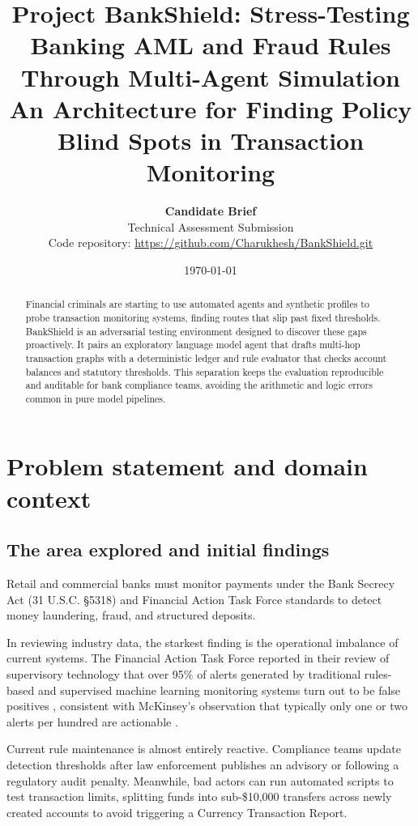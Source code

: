 \documentclass[10pt,twocolumn,a4paper]{article}
\title{\textbf{Project BankShield: Stress-Testing Banking AML and Fraud Rules Through Multi-Agent Simulation}\\[0.3em]
\large An Architecture for Finding Policy Blind Spots in Transaction Monitoring}
\author{\textbf{Candidate Brief} \\ Technical Assessment Submission \\ Code repository: \url{https://github.com/Charukhesh/BankShield.git}}
\date{\today}
\begin{document}
\maketitle

\begin{abstract}
Financial criminals are starting to use automated agents and synthetic profiles to probe transaction monitoring systems, finding routes that slip past fixed thresholds. BankShield is an adversarial testing environment designed to discover these gaps proactively. It pairs an exploratory language model agent that drafts multi-hop transaction graphs with a deterministic ledger and rule evaluator that checks account balances and statutory thresholds. This separation keeps the evaluation reproducible and auditable for bank compliance teams, avoiding the arithmetic and logic errors common in pure model pipelines.
\end{abstract}

\section{Problem statement and domain context}

\subsection{The area explored and initial findings}
Retail and commercial banks must monitor payments under the Bank Secrecy Act (31 U.S.C. \S 5318) and Financial Action Task Force standards to detect money laundering, fraud, and structured deposits. 

In reviewing industry data, the starkest finding is the operational imbalance of current systems. The Financial Action Task Force reported in their review of supervisory technology that over 95\% of alerts generated by traditional rules-based and supervised machine learning monitoring systems turn out to be false positives \cite{fatf2021tech}, consistent with McKinsey's observation that typically only one or two alerts per hundred are actionable \cite{mckinsey2020}. 

Current rule maintenance is almost entirely reactive. Compliance teams update detection thresholds after law enforcement publishes an advisory or following a regulatory audit penalty. Meanwhile, bad actors can run automated scripts to test transaction limits, splitting funds into sub-\$10,000 transfers across newly created accounts to avoid triggering a Currency Transaction Report.
\end{document}
